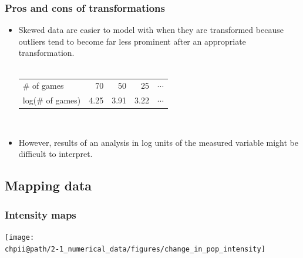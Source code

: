 \documentclass[slidestop,compress,mathserif]{beamer}
\makeatletter
\newcommand{\soln}[1]{\textit{#1}}
\def\chpii@path{../../Chp 2}
\makeatother
\begin{document}
\begin{frame}
\frametitle{Pros and cons of transformations}

\begin{itemize}

\item Skewed data are easier to model with when they are transformed because outliers tend to become far less prominent after an appropriate transformation. \\
$\:$ \\
\renewcommand{\arraystretch}{1.5}
\begin{tabular}{l r r r r }
\# of games		&  70 	& 50 		& 25 		 		& $\cdots$ \\
log(\# of games)	& 4.25	& 3.91 	& 3.22 	 	& $\cdots$
\end{tabular}

$\:$ \\

\item However, results of an analysis in log units of the measured variable might be difficult to interpret.

\end{itemize}

\pause


\soln{}

\end{frame}


\subsection{Mapping data}


\begin{frame}
\frametitle{Intensity maps}


\begin{center}
\texttt{[image: \\chpii@path/2-1\_numerical\_data/figures/change\_in\_pop\_intensity]}
\end{center}


\end{frame}
\end{document}
